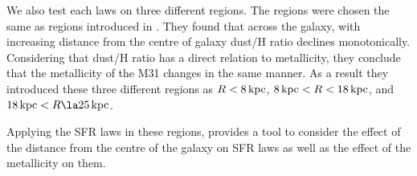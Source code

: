 \documentclass[useAMS,usenatbib]{mn2e}
\newcommand \kpc        {\,{\rm kpc}}
\begin{document}
We also test each laws on three different regions. The regions were chosen the same as regions introduced in \cite{Draine14}. They found that across the galaxy, with increasing distance from the centre of galaxy dust/H ratio declines monotonically. Considering that dust/H ratio has a direct relation to metallicity, they conclude that the metallicity of the M31 changes in the same manner. As a result they introduced these three different regions as $R< 8\kpc$, $8\kpc < R < 18\kpc$, and $18\kpc < R \la 25\kpc$. 


Applying the SFR laws in these regions, provides a tool to consider the effect of the distance from the centre of the galaxy on SFR laws as well as the effect of the metallicity on them. 
 
\end{document}

